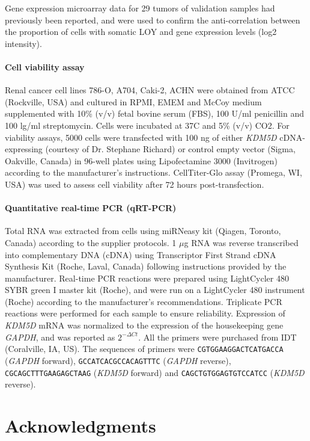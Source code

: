 Gene expression microarray data for 29 tumors of validation samples had previously been reported\cite{Wozniak2013}, and were used to confirm the anti-correlation between the proportion of cells with somatic LOY and gene expression levels (log2 intensity).

\paragraph{Cell viability assay}

Renal cancer cell lines 786-O, A704, Caki-2, ACHN were obtained from ATCC (Rockville, USA) and cultured in RPMI, EMEM and McCoy medium supplemented with 10\% (v/v) fetal bovine serum (FBS), 100 U/ml penicillin and 100 lg/ml streptomycin.
Cells were incubated at 37C and 5\% (v/v) CO2.
For viability assays, 5000 cells were transfected with 100 ng of either {\it KDM5D} cDNA-expressing (courtesy of Dr.
Stephane Richard) or control empty vector (Sigma, Oakville, Canada) in 96-well plates using Lipofectamine 3000 (Invitrogen) according to the manufacturer's instructions.
CellTiter-Glo assay (Promega, WI, USA) was used to assess cell viability after 72 hours post-transfection.

\paragraph{Quantitative real-time PCR (qRT-PCR)}

Total RNA was extracted from cells using miRNeasy kit (Qiagen, Toronto, Canada) according to the supplier protocols.
1 $\mu$g RNA was reverse transcribed into complementary DNA (cDNA) using Transcriptor First Strand cDNA Synthesis Kit (Roche, Laval, Canada) following instructions provided by the manufacturer.
Real-time PCR reactions were prepared using LightCycler 480 SYBR green I master kit (Roche), and were run on a LightCycler 480 instrument (Roche) according to the manufacturer's recommendations.
Triplicate PCR reactions were performed for each sample to ensure reliability.
Expression of {\it KDM5D} mRNA was normalized to the expression of the housekeeping gene {\it GAPDH}, and was reported as $2^{- \Delta C t}$.
All the primers were purchased from IDT (Coralville, IA, US).
The sequences of primers were \verb!CGTGGAAGGACTCATGACCA! ({\it GAPDH} forward), \verb!GCCATCACGCCACAGTTTC! ({\it GAPDH} reverse), \verb!CGCAGCTTTGAAGAGCTAAG! ({\it KDM5D} forward) and \verb!CAGCTGTGGAGTGTCCATCC! ({\it KDM5D} reverse).

\section{Acknowledgments}

